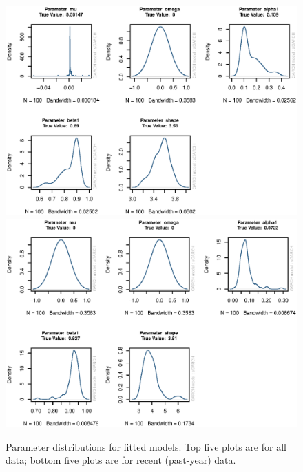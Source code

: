 \documentclass[12pt]{article}
\begin{document}
\begin{figure}[h]
\begin{center}
\centering
\includegraphics[width=.8\linewidth,height=.46\linewidth,trim={0 -20 0 0}]{boot_param_all}\\
\includegraphics[width=.8\linewidth,height=.46\linewidth]{boot_param_recent}\\
\caption{Parameter distributions for fitted models. Top five plots are for all data; bottom five plots are for recent (past-year) data.}
\label{fig:params}
\end{center}
\end{figure}
\end{document}
